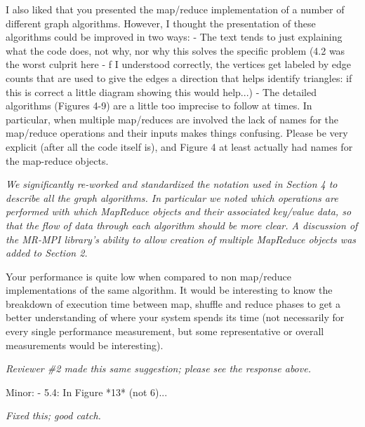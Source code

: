 \documentclass[11pt]{article}
\begin{document}
I also liked that you presented the map/reduce implementation of a
number of different graph algorithms. However, I thought the
presentation of these algorithms could be improved in two ways: - The
text tends to just explaining what the code does, not why, nor why
this solves the specific problem (4.2 was the worst culprit here - f I
understood correctly, the vertices get labeled by edge counts that are
used to give the edges a direction that helps identify triangles: if
this is correct a little diagram showing this would help...)  - The
detailed algorithms (Figures 4-9) are a little too imprecise to follow
at times. In particular, when multiple map/reduces are involved the
lack of names for the map/reduce operations and their inputs makes
things confusing. Please be very explicit (after all the code itself
is), and Figure 4 at least actually had names for the map-reduce
objects.

{\it We significantly re-worked and standardized the notation used
in Section 4 to describe all the graph algorithms.  In particular
we noted which operations are performed with which MapReduce
objects and their associated key/value data, so that the flow
of data through each algorithm should be more clear.  A discussion
of the MR-MPI library's ability to allow creation of multiple
MapReduce objects was added to Section 2.}

Your performance is quite low when compared to non map/reduce
implementations of the same algorithm. It would be interesting to know the
breakdown of execution time between map, shuffle and reduce phases to get a
better understanding of where your system spends its time (not necessarily
for every single performance measurement, but some representative or
overall measurements would be interesting).

{\it Reviewer \#2 made this same suggestion; please see the response above.}

Minor:
- 5.4: In Figure *13* (not 6)...

{\it Fixed this; good catch.}
\end{document}
